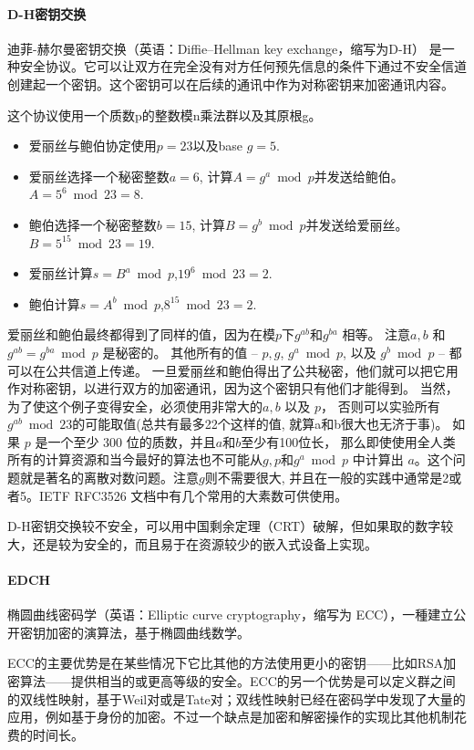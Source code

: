 \documentclass{ctexart}
\begin{document}
\paragraph{D-H密钥交换}
迪菲-赫尔曼密钥交换（英语：Diffie–Hellman key exchange，缩写为D-H） 是一种安全协议。它可以让双方在完全没有对方任何预先信息的条件下通过不安全信道创建起一个密钥。这个密钥可以在后续的通讯中作为对称密钥来加密通讯内容。

这个协议使用一个质数p的整数模n乘法群以及其原根g。
\begin{itemize}
	\item 爱丽丝与鲍伯协定使用$p=23$以及base $g=5$.
	\item 爱丽丝选择一个秘密整数$a=6$, 计算$A = g^a \bmod{p}$并发送给鲍伯。 $A = 5^6 \bmod{23} = 8$.
	\item 鲍伯选择一个秘密整数$b=15$, 计算$B = g^b \bmod{p}$并发送给爱丽丝。 $B = 5^15 \bmod{23} = 19$.
	\item 爱丽丝计算$s = B^a \bmod{p}$,$19^6 \bmod{23} = 2$.
	\item 鲍伯计算$s = A^b \bmod{p}$,$8^15 \bmod{23} = 2$.
\end{itemize}
爱丽丝和鲍伯最终都得到了同样的值，因为在模$p$下$g^{ab}和g^{ba}$ 相等。 注意$a, b$ 和 $g^{ab} = g^{ba} \bmod{p}$ 是秘密的。 其他所有的值 – $p, g$, $g^a \bmod{p}$, 以及 $g^b \bmod{p}$ – 都可以在公共信道上传递。 一旦爱丽丝和鲍伯得出了公共秘密，他们就可以把它用作对称密钥，以进行双方的加密通讯，因为这个密钥只有他们才能得到。 当然，为了使这个例子变得安全，必须使用非常大的$a, b$ 以及 $p$， 否则可以实验所有$g^{ab} \bmod{23}$的可能取值(总共有最多22个这样的值, 就算a和b很大也无济于事)。 如果 $p$ 是一个至少 300 位的质数，并且$a$和$b$至少有100位长， 那么即使使用全人类所有的计算资源和当今最好的算法也不可能从$g, p$和$g^a \bmod{p}$ 中计算出 $a$。这个问题就是著名的离散对数问题。注意$g$则不需要很大, 并且在一般的实践中通常是2或者5。IETF RFC3526 文档中有几个常用的大素数可供使用。

D-H密钥交换较不安全，可以用中国剩余定理（CRT）破解，但如果取的数字较大，还是较为安全的，而且易于在资源较少的嵌入式设备上实现。

\paragraph{EDCH}
椭圆曲线密码学（英语：Elliptic curve cryptography，缩写为 ECC），一種建立公开密钥加密的演算法，基于椭圆曲线数学。

ECC的主要优势是在某些情况下它比其他的方法使用更小的密钥——比如RSA加密算法——提供相当的或更高等级的安全。ECC的另一个优势是可以定义群之间的双线性映射，基于Weil对或是Tate对；双线性映射已经在密码学中发现了大量的应用，例如基于身份的加密。不过一个缺点是加密和解密操作的实现比其他机制花费的时间长。
\end{document}
